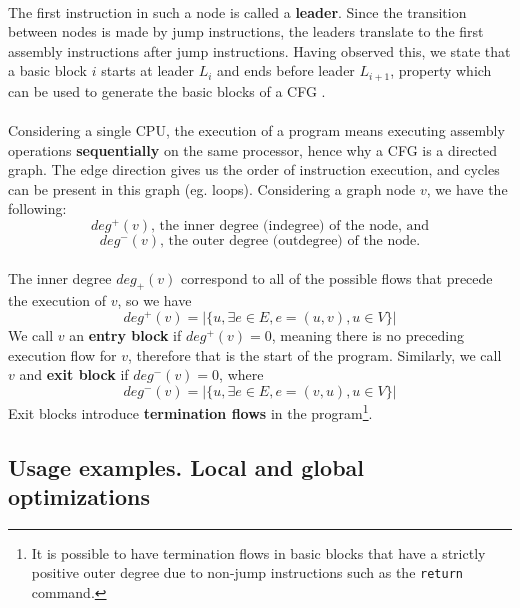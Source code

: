 \paragraph*{}
The first instruction in such a node is called a \textbf{leader}. Since the transition between nodes is made by jump instructions, the leaders translate to the first assembly instructions after jump instructions. Having observed this, we state that a basic block $i$ starts at leader $L_i$ and ends before leader $L_{i+1}$, property which can be used to generate the basic blocks of a CFG \cite{cfg-dcc}.

\paragraph*{}
Considering a single CPU, the execution of a program means executing assembly operations \textbf{sequentially} on the same processor, hence why a CFG is a directed graph. The edge direction gives us the order of instruction execution, and cycles can be present in this graph (eg. loops). Considering a graph node $v$, we have the following:
$$deg^+(v) \textrm{, the inner degree (indegree) of the node, and}$$
$$deg^-(v) \textrm{, the outer degree (outdegree) of the node.}$$

\paragraph*{}
The inner degree $deg_+(v)$ correspond to all of the possible flows that precede the execution of $v$, so we have
$$deg^+(v) = |\{u, \exists e \in E, e=(u, v), u \in V\}|$$
We call $v$ an \textbf{entry block} if $deg^+(v)=0$, meaning there is no preceding execution flow for $v$, therefore that is the start of the program. Similarly, we call $v$ and \textbf{exit block} if $deg^-(v)=0$, where
$$deg^-(v) = |\{u, \exists e \in E, e=(v, u), u \in V\}|$$
Exit blocks introduce \textbf{termination flows} in the program\footnote{It is possible to have termination flows in basic blocks that have a strictly positive outer degree due to non-jump instructions such as the \lstinline[columns=fixed]{return} command.}.

\subsection{Usage examples. Local and global optimizations}
